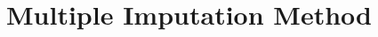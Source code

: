 \documentclass[preprint,12pt]{elsarticle}
\begin{document}

\section{Multiple Imputation Method}





%
%





\end{document}
